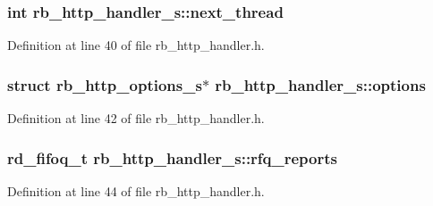 \hypertarget{structrb__http__handler__s_a708aed2b081f33ba413edbb62eb8959f}{}
\subsubsection[{next\+\_\+thread}]{\setlength{\rightskip}{0pt plus 5cm}int rb\+\_\+http\+\_\+handler\+\_\+s\+::next\+\_\+thread}\label{structrb__http__handler__s_a708aed2b081f33ba413edbb62eb8959f}


Definition at line 40 of file rb\+\_\+http\+\_\+handler.\+h.

\hypertarget{structrb__http__handler__s_a4297d05275e5a3b8247329902f7835ee}{}
\subsubsection[{options}]{\setlength{\rightskip}{0pt plus 5cm}struct {\bf rb\+\_\+http\+\_\+options\+\_\+s}$\ast$ rb\+\_\+http\+\_\+handler\+\_\+s\+::options}\label{structrb__http__handler__s_a4297d05275e5a3b8247329902f7835ee}


Definition at line 42 of file rb\+\_\+http\+\_\+handler.\+h.

\hypertarget{structrb__http__handler__s_a383f2047cfcdd9fe49d0deacf770a73c}{}
\subsubsection[{rfq\+\_\+reports}]{\setlength{\rightskip}{0pt plus 5cm}rd\+\_\+fifoq\+\_\+t rb\+\_\+http\+\_\+handler\+\_\+s\+::rfq\+\_\+reports}\label{structrb__http__handler__s_a383f2047cfcdd9fe49d0deacf770a73c}


Definition at line 44 of file rb\+\_\+http\+\_\+handler.\+h.

\hypertarget{structrb__http__handler__s_aa49e97bedda03106912088dad0b75e64}{}
